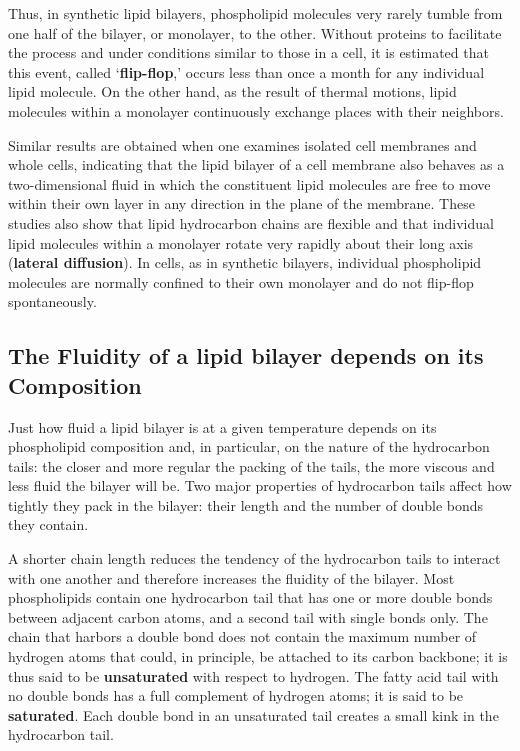 Thus, in synthetic lipid bilayers, phospholipid molecules very rarely tumble from one half of the bilayer,
or monolayer, to the other. Without proteins to facilitate the process
and under conditions similar to those in a cell, it is estimated that this
event, called ‘\textbf{flip-flop},’ occurs less than once a month for any individual
lipid molecule. On the other hand, as the result of thermal motions, lipid
molecules within a monolayer continuously exchange places with their neighbors.

Similar results are obtained when one examines isolated cell membranes
and whole cells, indicating that the lipid bilayer of a cell membrane
also behaves as a two-dimensional fluid in which the constituent lipid
molecules are free to move within their own layer in any direction in the
plane of the membrane. These studies also show that lipid hydrocarbon
chains are flexible and that individual lipid molecules within a monolayer
rotate very rapidly about their long axis (\textbf{lateral diffusion}). In cells, as in synthetic bilayers,
individual phospholipid molecules are normally confined to their own
monolayer and do not flip-flop spontaneously.

\subsection{The Fluidity of a lipid bilayer depends on its Composition}

Just how fluid a lipid
bilayer is at a given temperature depends on its phospholipid composition
and, in particular, on the nature of the hydrocarbon tails: the closer
and more regular the packing of the tails, the more viscous and less fluid
the bilayer will be. Two major properties of hydrocarbon tails affect how
tightly they pack in the bilayer: their length and the number of double
bonds they contain.

A shorter chain length reduces the tendency of the hydrocarbon tails
to interact with one another and therefore increases the fluidity of the
bilayer.
Most phospholipids contain one hydrocarbon tail that has one or more
double bonds between adjacent carbon atoms, and a second tail with
single bonds only. The chain that harbors a double bond
does not contain the maximum number of hydrogen atoms that could, in
principle, be attached to its carbon backbone; it is thus said to be \textbf{unsaturated}
with respect to hydrogen. The fatty acid tail with no double bonds
has a full complement of hydrogen atoms; it is said to be \textbf{saturated}. Each
double bond in an unsaturated tail creates a small kink in the hydrocarbon tail.

